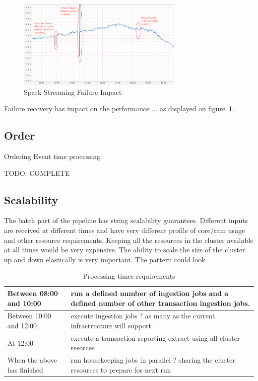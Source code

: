 \documentclass[a4paper, 10 pt, conference]{IEEEtran}
\begin{document}
\begin{figure}[hb]
	\begin{center}
		\caption{Spark Streaming Failure Impact}
		\label{fig:sparkStreamingFailureImpact}
		\includegraphics[width=8cm,keepaspectratio]{spark-streaming-failure-impact.png}
	\end{center}
\end{figure}

Failure recovery has impact on the performance ... as displayed on figure~\ref{fig:sparkStreamingFailureImpact}.

\subsection{Order}
Ordering
Event time processing

TODO: COMPLETE

\subsection{Scalability}
The batch part of the pipeline has string scalability guarantees. Different inputs are received at different times and have very different profile of core/ram usage and other resource requirements. Keeping all the resources in the cluster available at all times would be very expensive. The ability to scale the size of the cluster up and down elastically is very important. The pattern could look 

\begin{table}[h]
\caption{Processing times requirements}
\label{tbl:processing-times-requirements}
\begin{center}
  \begin{tabular}{ | l | p{3cm} | }
    \hline
    Between 08:00 and 10:00 & run a defined number of ingestion jobs and a defined number of other transaction ingestion jobs.  \\ \hline
    Between 10:00 and 12:00 & execute ingestion jobs ? as many as the current infrastructure will support. \\ \hline
    At 12:00 & execute a transaction reporting extract using all cluster resorces \\ \hline
    When the above has finished & run housekeeping jobs in parallel ? sharing the cluster resources to prepare for next run \\
    \hline
  \end{tabular}
\end{center}
\end{table}
\end{document}
